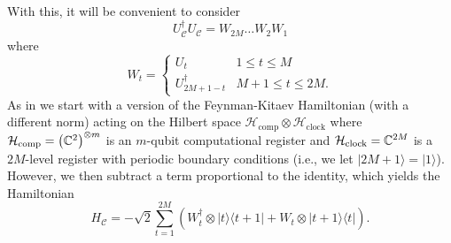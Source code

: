 \documentclass[../thesis-main/thesis-main]{subfiles}
\begin{document}
With this, it will be convenient to consider 
\begin{equation}
  U_{\mathcal{C}}^{\dagger}U_{\mathcal{C}}=W_{2M}\ldots W_{2}W_{1}
\end{equation}
where
\begin{equation}
W_{t}=\begin{cases}
U_{t} & 1\leq t\leq M\\
U_{2M+1-t}^{\dagger} & M+1 \le t \le 2M.
\end{cases}
\end{equation}
As in  we start with a version of the Feynman-Kitaev Hamiltonian (with a different norm) \cite{Fey85,KSV02} acting on the Hilbert space $\mathcal{H}_{\text{comp}} \otimes \mathcal{H}_{\text{clock}}$ where $\mathcal{H}_{\text{comp}} = \left(\mathbb{C}^{2}\right)^{\otimes m}$ is an $m$-qubit computational register and $\mathcal{H}_{\text{clock}}=\mathbb{C}^{2M}$ is a $2M$-level register with periodic boundary conditions (i.e., we let $|2M+1\rangle=|1\rangle$). However, we then subtract a term proportional to the identity, which yields the Hamiltonian
\begin{equation}
  H_{\mathcal{C}}=-\sqrt{2}\sum_{t=1}^{2M}\left(W_{t}^{\dagger}\otimes|t\rangle\langle t+1|+W_{t}\otimes|t+1\rangle\langle t|\right).\label{eq:H_x}
\end{equation}
\end{document}
